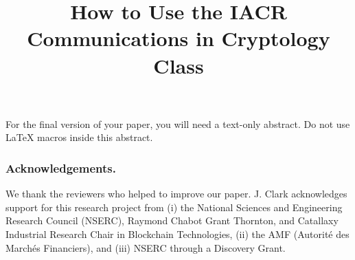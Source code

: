 \documentclass{iacrcc}
\title[running  = {The iacrcc class},
       subtitle = {A Template}
      ]{How to Use the IACR Communications in Cryptology Class}
\begin{document}
\maketitle

\begin{textabstract}
  For the final version of your paper, you will need a text-only abstract. Do
  not use LaTeX macros inside this abstract.
\end{textabstract}


%


%


\subsubsection*{Acknowledgements.} We thank the reviewers who helped to improve our paper. J. Clark acknowledges support for this research project from (i) the National Sciences and Engineering Research Council (NSERC), Raymond Chabot Grant Thornton, and Catallaxy Industrial Research Chair in Blockchain Technologies, (ii) the AMF (Autorité des Marchés Financiers), and (iii) NSERC through a Discovery Grant. 





\clearpage
\appendix
\end{document}
